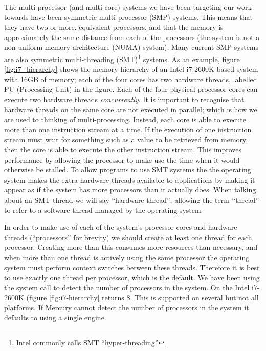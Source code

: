 The multi-processor (and multi-core) systems we have been targeting our work
towards have been symmetric multi-processor (SMP) systems.
This means that they have two or more, equivalent processors,
and that the memory is approximately the same distance from each of the
processors (the system is not a non-uniform memory architecture (NUMA)
system).
Many current SMP systems are also symmetric multi-threading (SMT)\footnote{
    Intel commonly calls SMT ``hyper-threading''}
systems.
As an example, figure \ref{fig:i7_hierarchy} shows the memory hierarchy of
an Intel i7-2600K based system with 16GB of memory;
each of the four cores has two hardware threads,
labelled PU (Processing Unit) in the figure.
Each of the four physical processor cores can execute two hardware threads
\emph{concurrently}.
It is important to recognise that hardware threads on the same core are not
executed in parallel;
which is how we are used to thinking of multi-processing.
Instead, each core is able to execute more than one instruction stream at a
time.
If the execution of one instruction stream must wait for something such as a
value to be retrieved from memory,
then the core is able to execute the other instruction stream.
This improves performance by allowing the processor to make use the time
when it would otherwise be stalled.
To allow programs to use SMT systems the the operating system makes the
extra hardware threads available to applications by making it appear as if
the system has more processors than it actually does.
When talking about an SMT thread we will say ``hardware thread'',
allowing the term ``thread'' to refer to a software thread managed by the
operating system.

In order to make use of each of the system's processor cores and hardware
threads (``processors'' for brevity)
we should create at least one thread for each processor.
Creating more than this consumes more resources than necessary,
and when more than one thread is actively using the same processor the
operating system must perform context switches between these threads.
Therefore it is best to use exactly one thread per processor,
which is the default.
We have been using the
system call to detect the number of
processors in the system.
On the Intel i7-2600K (figure \ref{fig:i7-hierarchy}
returns 8.
This is supported on several but not all platforms.
If Mercury cannot detect the number of processors in the system it defaults 
to using a single engine.

